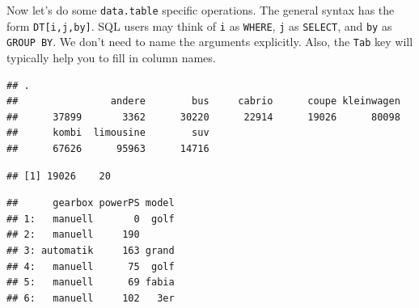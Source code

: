 \documentclass[]{book}
\newenvironment{Shaded}{\begin{snugshade}}{\end{snugshade}}
\newcommand{\StringTok}[1]{\textcolor[rgb]{0.31,0.60,0.02}{#1}}
\newcommand{\CommentTok}[1]{\textcolor[rgb]{0.56,0.35,0.01}{\textit{#1}}}
\newcommand{\OperatorTok}[1]{\textcolor[rgb]{0.81,0.36,0.00}{\textbf{#1}}}
\newcommand{\NormalTok}[1]{#1}
\theoremstyle{definition}
\theoremstyle{definition}
\theoremstyle{definition}
\theoremstyle{remark}
\begin{document}
Now let's do some \texttt{data.table} specific operations. The general
syntax has the form \texttt{DT{[}i,j,by{]}}. SQL users may think of
\texttt{i} as \texttt{WHERE}, \texttt{j} as \texttt{SELECT}, and
\texttt{by} as \texttt{GROUP\ BY}. We don't need to name the arguments
explicitly. Also, the \texttt{Tab} key will typically help you to fill
in column names.

\begin{Shaded}
\end{Shaded}

\begin{verbatim}
## .
##                andere        bus     cabrio      coupe kleinwagen 
##      37899       3362      30220      22914      19026      80098 
##      kombi  limousine        suv 
##      67626      95963      14716
\end{verbatim}

\begin{Shaded}
\end{Shaded}

\begin{verbatim}
## [1] 19026    20
\end{verbatim}

\begin{Shaded}
\end{Shaded}

\begin{verbatim}
##      gearbox powerPS model
## 1:   manuell       0  golf
## 2:   manuell     190      
## 3: automatik     163 grand
## 4:   manuell      75  golf
## 5:   manuell      69 fabia
## 6:   manuell     102   3er
\end{verbatim}

\begin{Shaded}
\end{Shaded}
\end{document}
